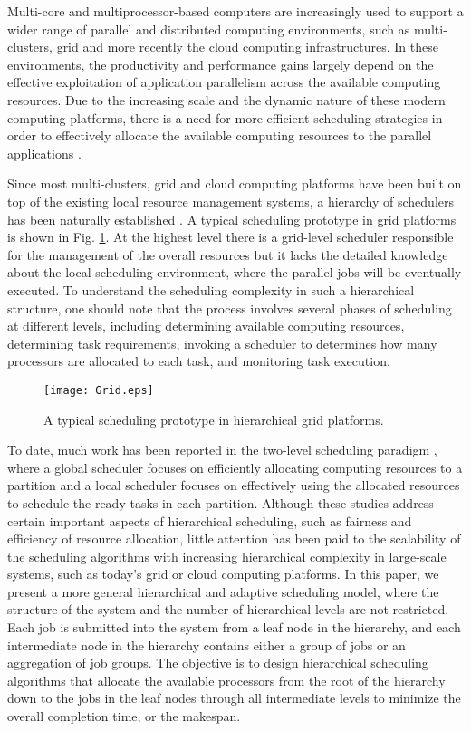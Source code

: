 \documentclass[10pt, a4paper]{article}
\begin{document}
Multi-core and multiprocessor-based computers are increasingly used to support a wider range of
parallel and distributed computing environments, such as multi-clusters, grid and more recently the
cloud computing infrastructures. In these environments, the productivity and performance gains
largely depend on the effective exploitation of application parallelism across the available
computing resources. Due to the increasing scale and the dynamic nature of these modern computing
platforms, there is a need for more efficient scheduling strategies in order to effectively
allocate the available computing resources to the parallel applications
\cite{Surendran11,CaoSun12}.

Since most multi-clusters, grid and cloud computing platforms have been built on top of the
existing local resource management systems, a hierarchy of schedulers has been naturally
established \cite{Cokuslu12,ChandraSh08,Abawajy09}. A typical scheduling prototype in grid
platforms is shown in Fig. \ref{fig:grid}. At the highest level there is a grid-level scheduler
responsible for the management of the overall resources but it lacks the detailed knowledge about
the local scheduling environment, where the parallel jobs will be eventually executed. To
understand the scheduling complexity in such a hierarchical structure, one should note that the
process involves several phases of scheduling at different levels, including determining available
computing resources, determining task requirements, invoking a scheduler to determines how many
processors are allocated to each task, and monitoring task execution.

\begin{figure}[t]
\centering
    \texttt{[image: Grid.eps]}
    \caption{A typical scheduling prototype in hierarchical grid platforms.}
    \label{fig:grid}
\end{figure}

To date, much work has been reported in the two-level scheduling paradigm
\cite{AgrawalHeLe06,HeHsLe06,HeHsLe08,SunCaHs11,AgrawalLeHe08,SunCaHs09}, where a global scheduler
focuses on efficiently allocating computing resources to a partition and a local scheduler focuses
on effectively using the allocated resources to schedule the ready tasks in each partition.
Although these studies address certain important aspects of hierarchical scheduling, such as
fairness and efficiency of resource allocation, little attention has been paid to the scalability
of the scheduling algorithms with increasing hierarchical complexity in large-scale systems, such
as today's grid or cloud computing platforms. In this paper, we present a more general hierarchical
and adaptive scheduling model, where the structure of the system and the number of hierarchical
levels are not restricted. Each job is submitted into the system from a leaf node in the hierarchy,
and each intermediate node in the hierarchy contains either a group of jobs or an aggregation of
job groups. The objective is to design hierarchical scheduling algorithms that allocate the
available processors from the root of the hierarchy down to the jobs in the leaf nodes through all
intermediate levels to minimize the overall completion time, or the makespan.
\end{document}
